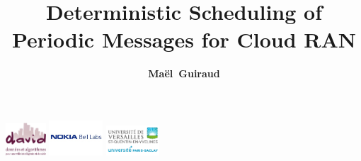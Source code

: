 \documentclass[10 pt]{beamer}
\title{Deterministic Scheduling of Periodic Messages for Cloud RAN}
\author{{\bf Maël~Guiraud}}
\institute[Nokia Bell Labs, DAVID-UVSQ] 
{
  DAVID, Universit\'e de Versailles Saint Quentin -
  Nokia Bell Labs France \\
}
\begin{document}
\begin{frame}

  \titlepage
  \centering
  \includegraphics [width=15mm]{logod.png} \hspace{1cm} \includegraphics [width=20mm]{logon.png} \hspace{1cm} \includegraphics [width=20mm]{logo.png} \\
\end{frame}
\end{document}
